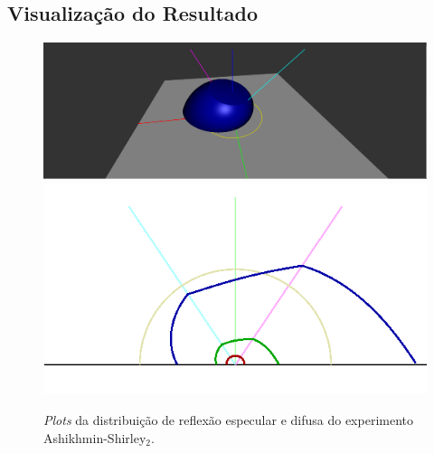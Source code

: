 \subsection{Visualização do Resultado}
\begin{figure}[H]
    \caption{\small{\textit{Plots} da distribuição de reflexão especular e difusa do experimento Ashikhmin-Shirley$_2$.}}
    \label{fig-ashikhmin-shirley-alternative-plots}
    \vspace{42px}
  \includegraphics[width=\linewidth]{./Imagens/brdfs/ashikhmin-shirley-alternative-3D-plot}
\endminipage\hfill
{}
  \includegraphics[width=\linewidth]{./Imagens/brdfs/ashikhmin-shirley-alternative-polar-plot.png}
\endminipage\hfill
\end{figure}

